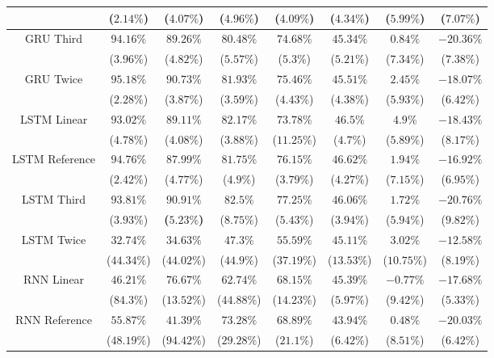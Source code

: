 \begin{table}[!ht]
{\begin{tabular}{|c|c|c|c|c|c|c|c|}
			 & \textbf{(}$\mathbf{2.14\%}$\textbf{)} & ($4.07\%$) & ($4.96\%$) & ($4.09\%$) & ($4.34\%$) & ($5.99\%$) & ($7.07\%$) \\ \hline
			\multirow{2}{*}{GRU Third} & $94.16\%$ & $89.26\%$ & $80.48\%$ & $74.68\%$ & $45.34\%$ & $0.84\%$ & $-20.36\%$ \\
			 & ($3.96\%$) & ($4.82\%$) & ($5.57\%$) & ($5.3\%$) & ($5.21\%$) & ($7.34\%$) & ($7.38\%$) \\ \hline
			\multirow{2}{*}{GRU Twice} & $95.18\%$ & $90.73\%$ & $81.93\%$ & $75.46\%$ & $45.51\%$ & $2.45\%$ & $-18.07\%$ \\
			 & ($2.28\%$) & ($3.87\%$) & ($3.59\%$) & ($4.43\%$) & ($4.38\%$) & ($5.93\%$) & ($6.42\%$) \\ \hline
			\multirow{2}{*}{LSTM Linear} & $93.02\%$ & $89.11\%$ & $82.17\%$ & $73.78\%$ & $46.5\%$ & $4.9\%$ & $-18.43\%$ \\
			 & ($4.78\%$) & ($4.08\%$) & ($3.88\%$) & ($11.25\%$) & ($4.7\%$) & ($5.89\%$) & ($8.17\%$) \\ \hline
			\multirow{2}{*}{LSTM Reference} & $94.76\%$ & $87.99\%$ & $81.75\%$ & $76.15\%$ & $46.62\%$ & $1.94\%$ & $-16.92\%$ \\
			 & ($2.42\%$) & ($4.77\%$) & ($4.9\%$) & ($3.79\%$) & ($4.27\%$) & ($7.15\%$) & ($6.95\%$) \\ \hline
			\multirow{2}{*}{LSTM Third} & $93.81\%$ & $\mathbf{90.91\%}$ & $82.5\%$ & $77.25\%$ & $46.06\%$ & $1.72\%$ & $-20.76\%$ \\
			 & ($3.93\%$) & \textbf{(}$\mathbf{5.23\%}$\textbf{)} & ($8.75\%$) & ($5.43\%$) & ($3.94\%$) & ($5.94\%$) & ($9.82\%$) \\ \hline
			\multirow{2}{*}{LSTM Twice} & $32.74\%$ & $34.63\%$ & $47.3\%$ & $55.59\%$ & $45.11\%$ & $3.02\%$ & $-12.58\%$ \\
			 & ($44.34\%$) & ($44.02\%$) & ($44.9\%$) & ($37.19\%$) & ($13.53\%$) & ($10.75\%$) & ($8.19\%$) \\ \hline
			\multirow{2}{*}{RNN Linear} & $46.21\%$ & $76.67\%$ & $62.74\%$ & $68.15\%$ & $45.39\%$ & $-0.77\%$ & $-17.68\%$ \\
			 & ($84.3\%$) & ($13.52\%$) & ($44.88\%$) & ($14.23\%$) & ($5.97\%$) & ($9.42\%$) & ($5.33\%$) \\ \hline
			\multirow{2}{*}{RNN Reference} & $55.87\%$ & $41.39\%$ & $73.28\%$ & $68.89\%$ & $43.94\%$ & $0.48\%$ & $-20.03\%$ \\
			 & ($48.19\%$) & ($94.42\%$) & ($29.28\%$) & ($21.1\%$) & ($6.42\%$) & ($8.51\%$) & ($6.42\%$) \\ \hline

\end{tabular}}
\end{table}
